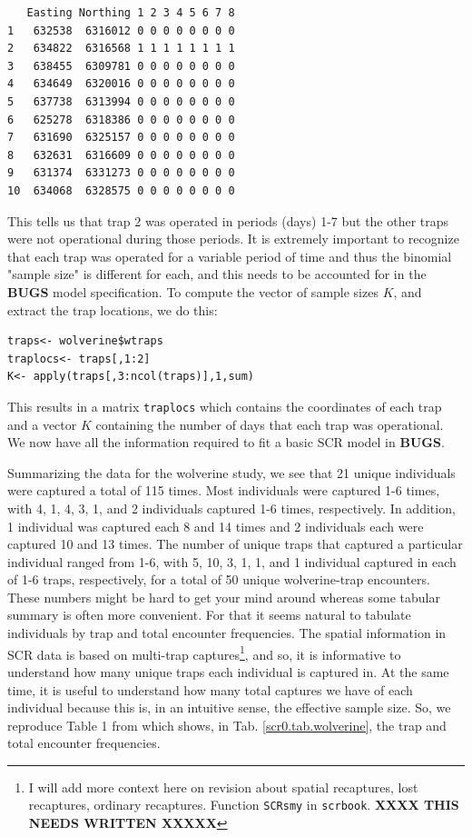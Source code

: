 {{\begin{verbatim}
   Easting Northing 1 2 3 4 5 6 7 8 
1   632538  6316012 0 0 0 0 0 0 0 0
2   634822  6316568 1 1 1 1 1 1 1 1
3   638455  6309781 0 0 0 0 0 0 0 0
4   634649  6320016 0 0 0 0 0 0 0 0
5   637738  6313994 0 0 0 0 0 0 0 0
6   625278  6318386 0 0 0 0 0 0 0 0
7   631690  6325157 0 0 0 0 0 0 0 0
8   632631  6316609 0 0 0 0 0 0 0 0
9   631374  6331273 0 0 0 0 0 0 0 0
10  634068  6328575 0 0 0 0 0 0 0 0
\end{verbatim}
}
This tells us that trap 2 was operated in periods (days) 1-7 but the
other traps were not operational during those periods. It is extremely
important to recognize that each trap was operated for a variable
period of time and thus the binomial "sample size" is different for
each, and this needs to be accounted for in the {\bf BUGS} model
specification.  To compute the vector of sample sizes $K$, and extract
the trap locations, we do this:
\begin{verbatim}
traps<- wolverine$wtraps
traplocs<- traps[,1:2]
K<- apply(traps[,3:ncol(traps)],1,sum)
\end{verbatim}
This results in a matrix \mbox{\tt traplocs} which contains the coordinates of
each trap and a vector $K$ containing the number of days that each trap
was operational. We now have all the information required to fit a
basic SCR model in {\bf BUGS}.



Summarizing the data for the wolverine study, we see that 21
unique individuals were captured a total of 115 times. Most
individuals were captured 1-6 times, with 4, 1, 4, 3, 1, and 2
individuals captured 1-6 times, respectively.  In addition, 1
individual was captured each 8 and 14 times and 2 individuals each
were captured 10 and 13 times.  The number of unique traps that
captured a particular individual ranged from 1-6, with 5, 10, 3, 1, 1,
and 1 individual captured in each of 1-6 traps, respectively, for a
total of 50 unique wolverine-trap encounters.  These numbers might be
hard to get your mind around whereas some tabular summary is often
more convenient. For that it seems natural to tabulate individuals by
trap and total encounter frequencies. The spatial information in SCR
data is based on multi-trap captures\footnote{I will add more context
  here on revision about spatial recaptures, lost recaptures, ordinary
  recaptures. Function \mbox{\tt SCRsmy} in \mbox{\tt scrbook}. {\bf
    XXXX THIS NEEDS WRITTEN XXXXX}  }, and
so, it is informative to understand how many unique traps each
individual is captured in. At the same time, it is useful to
understand how many total captures we have of each individual because
this is, in an intuitive sense, the effective sample size.  So, we
reproduce Table 1 from \citet{royle_etal:2011jwm} which shows, 
in Tab. \ref{scr0.tab.wolverine}, the trap
and total encounter frequencies.



}
